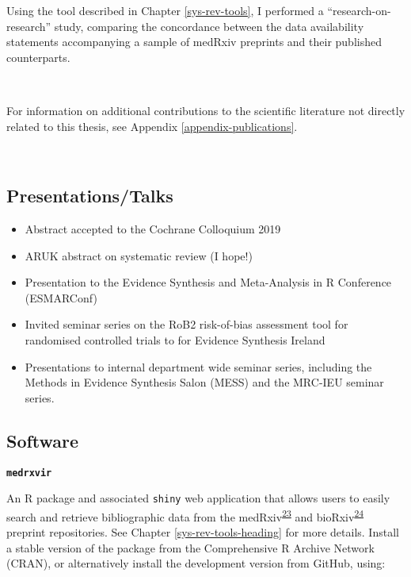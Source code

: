 \documentclass[a4paper, twoside]{templates/ociamthesis}
\providecommand{\tightlist}{%
  \setlength{\itemsep}{0pt}\setlength{\parskip}{0pt}}
\begin{document}
Using the tool described in Chapter \ref{sys-rev-tools}, I performed a ``research-on-research'' study, comparing the concordance between the data availability statements accompanying a sample of medRxiv preprints and their published counterparts.

~

For information on additional contributions to the scientific literature not directly related to this thesis, see Appendix \ref{appendix-publications}.

~

\hypertarget{presentationstalks}{%
\subsection{Presentations/Talks}\label{presentationstalks}}

\begin{itemize}
\tightlist
\item
  Abstract accepted to the Cochrane Colloquium 2019
\item
  ARUK abstract on systematic review (I hope!)
\item
  Presentation to the Evidence Synthesis and Meta-Analysis in R Conference (ESMARConf)
\item
  Invited seminar series on the RoB2 risk-of-bias assessment tool for randomised controlled trials to for Evidence Synthesis Ireland
\item
  Presentations to internal department wide seminar series, including the Methods in Evidence Synthesis Salon (MESS) and the MRC-IEU seminar series.
\end{itemize}

\hypertarget{outputs-software}{%
\subsection{Software}\label{outputs-software}}

\textbf{\texttt{medrxvir}}

An R package and associated \texttt{shiny} web application that allows users to easily search and retrieve bibliographic data from the medRxiv\textsuperscript{\protect\hyperlink{ref-rawlinson2019}{23}} and bioRxiv\textsuperscript{\protect\hyperlink{ref-sever2019}{24}} preprint repositories. See Chapter \ref{sys-rev-tools-heading} for more details. Install a stable version of the package from the Comprehensive R Archive Network (CRAN), or alternatively install the development version from GitHub, using:
\end{document}
